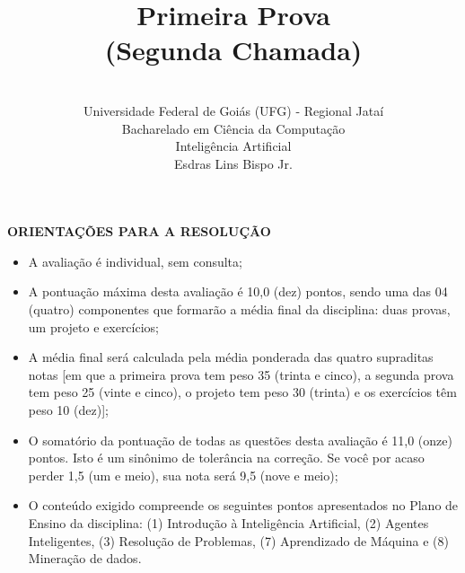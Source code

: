 \documentclass[12pt,a4paper,oneside]{article}
\author{\\Universidade Federal de Goiás (UFG) - Regional Jataí\\Bacharelado em Ciência da Computação \\Inteligência Artificial \\Esdras Lins Bispo Jr.}
\title{\sc \huge Primeira Prova \\(Segunda Chamada)}
\begin{document}
\maketitle

{\bf ORIENTAÇÕES PARA A RESOLUÇÃO}

\begin{itemize}
	\item A avaliação é individual, sem consulta;
	\item A pontuação máxima desta avaliação é 10,0 (dez) pontos, sendo uma das 04 (quatro) componentes que formarão a média final da disciplina: duas provas, um projeto e exercícios;
	\item A média final será calculada pela média ponderada das quatro supraditas notas [em que a primeira prova tem peso 35 (trinta e cinco), a segunda prova tem peso 25 (vinte e cinco), o projeto tem peso 30 (trinta) e os exercícios têm peso 10 (dez)];
	\item O somatório da pontuação de todas as questões desta avaliação é 11,0 (onze) pontos. Isto é um sinônimo de tolerância na correção. Se você por acaso perder 1,5 (um e meio), sua nota será 9,5 (nove e meio);
	\item O conteúdo exigido compreende os seguintes pontos apresentados no Plano de Ensino da disciplina: (1) Introdução à Inteligência Artificial, (2) Agentes Inteligentes, (3) Resolução de Problemas, (7) Aprendizado de Máquina e (8) Mineração de dados.
\end{itemize}

\begin{center}
\end{center}

\newpage
\end{document}
